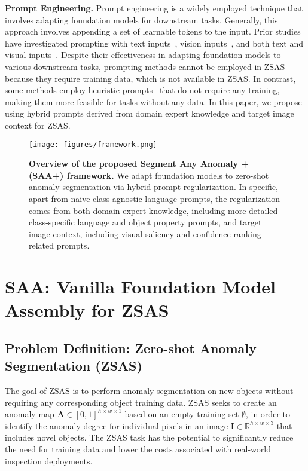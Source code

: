 \documentclass{article}
\begin{document}
\noindent\textbf{Prompt Engineering. } 
Prompt engineering is a widely employed technique that involves adapting foundation models for downstream tasks. Generally, this approach involves appending a set of learnable tokens to the input.  Prior studies have investigated prompting with text inputs~\cite{zhou_conditional}, vision inputs~\cite{ju_prompting_2022, jia_visual_2022, bahng_exploring_2022}, and both text and visual inputs~\cite{zang_unified_2022, shen_multitask_2022, zhou_learning_2022}. Despite their effectiveness in adapting foundation models to various downstream tasks, prompting methods cannot be employed in ZSAS because they require training data, which is not available in ZSAS. In contrast, some methods employ heuristic prompts~\cite{shtedritski_what_2023} that do not require any training, making them more feasible for tasks without any data. In this paper, we propose using hybrid prompts derived from domain expert knowledge and target image context for ZSAS. 

\begin{figure*}[!t]
  \centering
  \texttt{[image: figures/framework.png]}
  \vspace{-0.15in}
  \caption{\textbf{Overview of the proposed Segment Any Anomaly + (SAA+) framework.} We adapt foundation models to zero-shot anomaly segmentation via hybrid prompt regularization. In specific, apart from naive class-agnostic language prompts, the regularization comes from both domain expert knowledge, including more detailed class-specific language and object property prompts, and target image context, including visual saliency and confidence ranking-related prompts.
  }  
  \label{fig:framework}
  
\end{figure*}


\section{SAA: Vanilla Foundation Model Assembly for ZSAS}

\subsection{Problem Definition: Zero-shot Anomaly Segmentation (ZSAS)}

The goal of ZSAS is to perform anomaly segmentation on new objects without requiring any corresponding object training data. ZSAS seeks to create an anomaly map $\mathbf{A} \in [0,1]^{h \times w \times 1}$ based on an empty training set $\emptyset$, in order to identify the anomaly degree for individual pixels in an image $\mathbf{I} \in \mathbb{R}^{h \times w \times 3}$ that includes novel objects. The ZSAS task has the potential to significantly reduce the need for training data and lower the costs associated with real-world inspection deployments.
\end{document}
